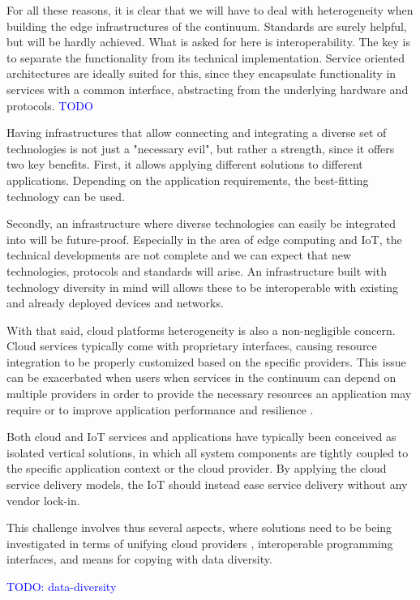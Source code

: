 \documentclass{ieeeaccess}
\begin{document}
For all these reasons, it is clear that we will have to deal with heterogeneity when building the edge infrastructures of the continuum. Standards are surely helpful, but will be hardly achieved. What is asked for here is interoperability. The key is to separate the functionality from its technical implementation. Service oriented architectures are ideally suited for this, since they encapsulate functionality in services with a common interface, abstracting from the underlying hardware and protocols. \textcolor{blue}{TODO}

Having infrastructures that allow connecting and integrating a diverse set of technologies is not just a "necessary evil", but rather a strength, since it offers two key benefits. First, it allows applying different solutions to different applications. Depending on the application requirements, the best-fitting technology can be used.

Secondly, an infrastructure where diverse technologies can easily be integrated into will be future-proof. Especially in the area of edge computing and IoT, the technical developments are not complete and we can expect that new technologies, protocols and standards will arise. An infrastructure built with technology diversity in mind will allows these to be interoperable with existing and already deployed devices and networks.

With that said, cloud platforms heterogeneity is also a non-negligible concern. Cloud services typically come with proprietary interfaces, causing resource integration to be properly customized based on the specific providers. This issue can be exacerbated when users when services in the continuum can depend on multiple providers in order to provide the necessary resources an application may require or to improve application performance and resilience \cite{cloud-iot}.

Both cloud and IoT services and applications have typically been conceived as isolated vertical solutions, in which all system components are tightly coupled to the specific application context or the cloud provider. By applying the cloud service delivery models, the IoT should instead ease service delivery without any vendor lock-in.

This challenge involves thus several aspects, where solutions need to be being investigated in terms of unifying cloud providers \cite{inter-cloud}, interoperable programming interfaces, and means for copying with data diversity.

\textcolor{blue}{TODO: data-diversity}
\end{document}
